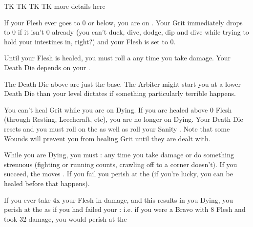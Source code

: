 {  TK TK TK TK more details here



  If your Flesh ever goes to 0 or below, you are on  .  Your Grit immediately drops to 0 if it isn't 0 already (you can't duck, dive, dodge, dip and dive while trying to hold your intestines in, right?) and your Flesh is set to 0.

  Until your Flesh is healed, you must roll a \DEATH any time you take damage.  Your Death Die depends on your \LVL.


  The Death Die above are just the base. The Arbiter might start you at a lower Death Die than your level dictates if something particularly terrible happens. 

  You can't heal Grit while you are on Dying.  If you are healed above 0 Flesh (through Resting, Leechcraft, etc), you are no longer on Dying.  Your Death Die resets and you must roll on the  as well as roll your Sanity \UD.  Note that some Wounds will prevent you from healing Grit until they are dealt with.



  While you are Dying, you must \RS : \DEATH any time you take damage or do something strenuous (fighting or running counts, crawling off to a corner doesn't). If you succeed, the \DEATH moves \DCDOWN. If you fail you perish at the  (if you're lucky, you can be healed before that happens).


  If you ever take 4x your \MAX Flesh in damage, and this results in you Dying, you perish at the  as if you had failed your \RS : \DEATH i.e. if you were a Bravo with 8 Flesh and took 32 damage, you would perish at the 


}
